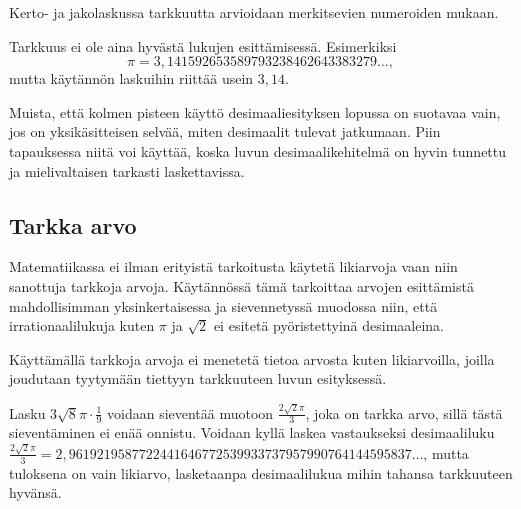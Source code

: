 Kerto- ja jakolaskussa tarkkuutta arvioidaan merkitsevien numeroiden mukaan.


Tarkkuus ei ole aina hyvästä lukujen esittämisessä. Esimerkiksi
\[\pi = 3,141592653589793238462643383279 \ldots, \]
mutta käytännön laskuihin riittää usein $3,14$.

Muista, että kolmen pisteen käyttö desimaaliesityksen lopussa on suotavaa vain, jos on yksikäsitteisen selvää, miten desimaalit tulevat jatkumaan. Piin tapauksessa niitä voi käyttää, koska luvun desimaalikehitelmä on hyvin tunnettu ja mielivaltaisen tarkasti laskettavissa.

\subsection{Tarkka arvo}

Matematiikassa ei ilman erityistä tarkoitusta käytetä likiarvoja vaan niin sanottuja tarkkoja arvoja. Käytännössä tämä tarkoittaa arvojen esittämistä mahdollisimman yksinkertaisessa ja sievennetyssä muodossa niin, että irrationaalilukuja kuten $\pi$ ja $\sqrt{2}$ ei esitetä pyöristettyinä desimaaleina.

Käyttämällä tarkkoja arvoja ei menetetä tietoa arvosta kuten likiarvoilla, joilla joudutaan tyytymään tiettyyn tarkkuuteen luvun esityksessä.

\begin{esimerkki}
Lasku $3\sqrt{8}\pi \cdot \frac{1}{9}$ voidaan sieventää muotoon $\frac{2\sqrt{2}\pi}{3}$, joka on tarkka arvo, sillä tästä sieventäminen ei enää onnistu. Voidaan kyllä laskea vastaukseksi desimaaliluku $\frac{2\sqrt{2}\pi}{3}=2,9619219587722441646772539933737957990764144595837\ldots$, mutta tuloksena on vain likiarvo, lasketaanpa desimaalilukua mihin tahansa tarkkuuteen hyvänsä.
\end{esimerkki}

